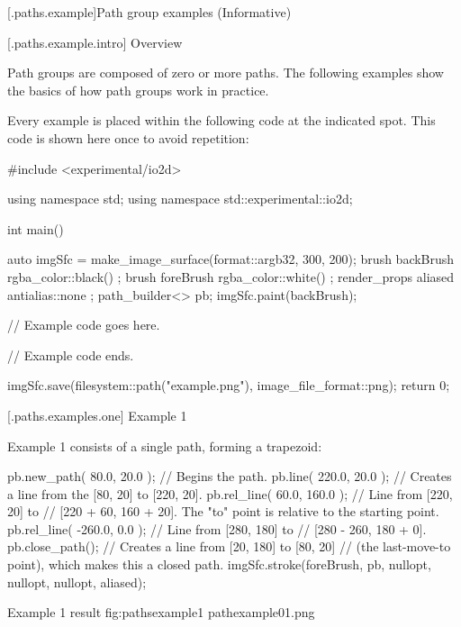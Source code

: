 

 [\iotwod.paths.example]{Path group examples (Informative)}

 [\iotwod.paths.example.intro] {Overview}

\pnum
Path groups are composed of zero or more paths. The following examples show the basics of how path groups work in practice.

\pnum
Every example is placed within the following code at the indicated spot. This code is shown here once to avoid repetition:

\begin{codeblock}
#include <experimental/io2d>

using namespace std;
using namespace std::experimental::io2d;

int main() {
  auto imgSfc = make_image_surface(format::argb32, 300, 200);
  brush backBrush{ rgba_color::black() };
  brush foreBrush{ rgba_color::white() };
  render_props aliased{ antialias::none };
  path_builder<> pb{};
  imgSfc.paint(backBrush);
  
  // Example code goes here.

  // Example code ends.
  
  imgSfc.save(filesystem::path("example.png"), image_file_format::png);
  return 0;
}
\end{codeblock}

 [\iotwod.paths.examples.one] {Example 1}

\pnum
Example 1 consists of a single path, forming a trapezoid:

\begin{codeblock}
  pb.new_path({ 80.0, 20.0 }); // Begins the path.
  pb.line({ 220.0, 20.0 }); // Creates a line from the [80, 20] to [220, 20].
  pb.rel_line({ 60.0, 160.0 }); // Line from [220, 20] to
    // [220 + 60, 160 + 20]. The "to" point is relative to the starting point.
  pb.rel_line({ -260.0, 0.0 }); // Line from [280, 180] to 
    // [280 - 260, 180 + 0].
  pb.close_path(); // Creates a line from [20, 180] to [80, 20] 
    // (the last-move-to point), which makes this a closed path.
  imgSfc.stroke(foreBrush, pb, nullopt, nullopt, nullopt, aliased);
\end{codeblock}

\begin{importgraphiciotwod}
{Example 1 result}
{fig:pathsexample1}
{pathexample01.png}
\end{importgraphiciotwod}

